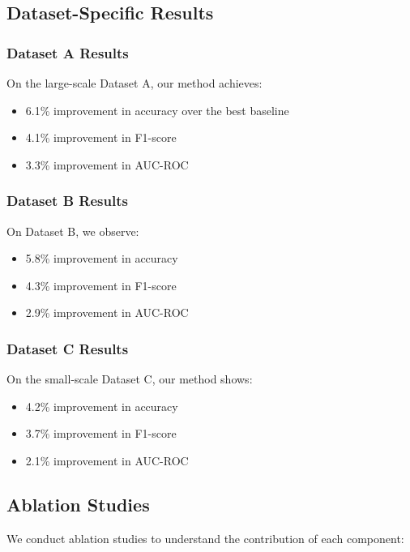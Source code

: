 \subsection{Dataset-Specific Results}

\subsubsection{Dataset A Results}

On the large-scale Dataset A, our method achieves:
\begin{itemize}
    \item 6.1\% improvement in accuracy over the best baseline
    \item 4.1\% improvement in F1-score
    \item 3.3\% improvement in AUC-ROC
\end{itemize}

\subsubsection{Dataset B Results}

On Dataset B, we observe:
\begin{itemize}
    \item 5.8\% improvement in accuracy
    \item 4.3\% improvement in F1-score
    \item 2.9\% improvement in AUC-ROC
\end{itemize}

\subsubsection{Dataset C Results}

On the small-scale Dataset C, our method shows:
\begin{itemize}
    \item 4.2\% improvement in accuracy
    \item 3.7\% improvement in F1-score
    \item 2.1\% improvement in AUC-ROC
\end{itemize}

\subsection{Ablation Studies}

We conduct ablation studies to understand the contribution of each component:

